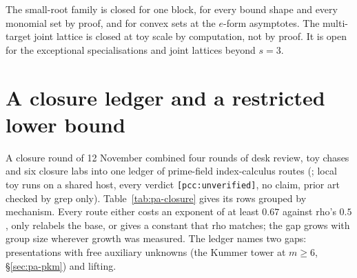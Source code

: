 The small-root family is closed for one block, for every bound shape and
every monomial set by proof, and for convex sets at the $e$-form
asymptotes. The multi-target joint lattice is closed at toy scale by
computation, not by proof. It is open for the exceptional specialisations
and joint lattices beyond $s=3$.

\section{A closure ledger and a restricted lower bound}\label{sec:pa-closure}

A closure round of 12 November combined four rounds of desk review, toy
chases and six closure labs into one ledger of prime-field index-calculus
routes (;
local toy runs on a shared host, every verdict \texttt{[pcc:unverified]},
no claim, prior art checked by grep only). Table~\ref{tab:pa-closure} gives
its rows grouped by mechanism. Every route either costs an exponent of at
least $0.67$ against rho's $0.5$, only relabels the base, or gives a
constant that rho matches; the gap grows with group size wherever growth was
measured. The ledger names two gaps: presentations with free auxiliary
unknowns (the Kummer tower at $m\ge6$, \S\ref{sec:pa-pkm}) and lifting.

